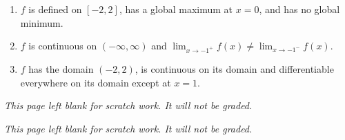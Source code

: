\documentclass{article}
\begin{document}
\begin{enumerate}
\begin{enumerate}
        
    \item $f$ is defined on $[-2,2]$, has a global maximum at $x=0$, and has no global minimum.\\
   \vfill
     \newpage
     \item $f$ is continuous on $(-\infty, \infty)$ and $\displaystyle{\lim_{x\to -1^+} f(x) \neq \lim_{x\to-1^-} f(x)}$. \\
     \vfill

        \item $f$ has the domain $(-2,2)$, is continuous on its domain and differentiable everywhere on its domain except at $x=1$. \\
        
       \vfill
       
    \end{enumerate}
\end{enumerate}



\newpage
\emph{This page left blank for scratch work. It will not be graded.}

\newpage

\emph{This page left blank for scratch work. It will not be graded.}
\end{document}
